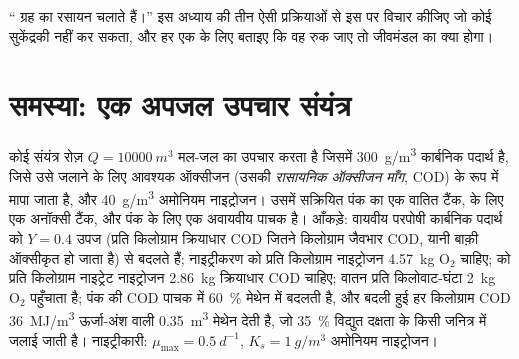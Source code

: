 \begin{exercise}[$\star\star\star$]\label{exo:b2:microbial-metabolism:12}
`` ग्रह का रसायन चलाते हैं।'' इस अध्याय की तीन ऐसी
प्रक्रियाओं से इस पर विचार कीजिए जो कोई सुकेंद्रकी नहीं कर सकता, और हर
एक के लिए बताइए कि वह रुक जाए तो जीवमंडल का क्या होगा।
\end{exercise}

\section{समस्या: एक अपजल उपचार संयंत्र}

\begin{problem}
\label{pb:b2:microbial-metabolism:1}
कोई संयंत्र रोज़ $Q = \qty{10000}{m^3}$ मल-जल का उपचार करता है जिसमें
\qty{300}{g/m^3} कार्बनिक पदार्थ है, जिसे उसे जलाने के लिए आवश्यक
ऑक्सीजन (उसकी \emph{रासायनिक ऑक्सीजन माँग}, COD) के रूप में मापा जाता
है, और \qty{40}{g/m^3} अमोनियम नाइट्रोजन। उसमें सक्रियित पंक का एक
वातित टैंक,  के लिए एक अनॉक्सी टैंक, और पंक के लिए
एक अवायवीय पाचक है। आँकड़े: वायवीय परपोषी कार्बनिक पदार्थ को $Y = 0.4$
उपज (प्रति किलोग्राम क्रियाधार COD जितने किलोग्राम जैवभार COD, यानी बाक़ी
ऑक्सीकृत हो जाता है) से बदलते हैं; नाइट्रीकरण को प्रति किलोग्राम
नाइट्रोजन \qty{4.57}{kg} $\mathrm{O_2}$ चाहिए;  को
प्रति किलोग्राम नाइट्रेट नाइट्रोजन \qty{2.86}{kg} क्रियाधार COD
चाहिए; वातन प्रति किलोवाट-घंटा \qty{2}{kg} $\mathrm{O_2}$ पहुँचाता है;
पंक की COD पाचक में \qty{60}{\%} मेथेन में बदलती है, और बदली हुई हर
किलोग्राम COD \qty{36}{MJ/m^3} ऊर्जा-अंश वाली \qty{0.35}{m^3} मेथेन
देती है, जो \qty{35}{\%} विद्युत दक्षता के किसी जनित्र में जलाई जाती
है। नाइट्रीकारी: $\mu_{\max} = \qty{0.5}{d^{-1}}$, $K_s =
\qty{1}{g/m^3}$ अमोनियम नाइट्रोजन।


\end{problem}

